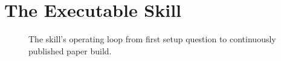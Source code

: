 \section{The Executable Skill}\label{sec:skill}
%

\begin{figure}[t]
\centering
\caption{The skill's operating loop from first setup question to
continuously published paper build.}
\label{fig:workflow}
\end{figure}
